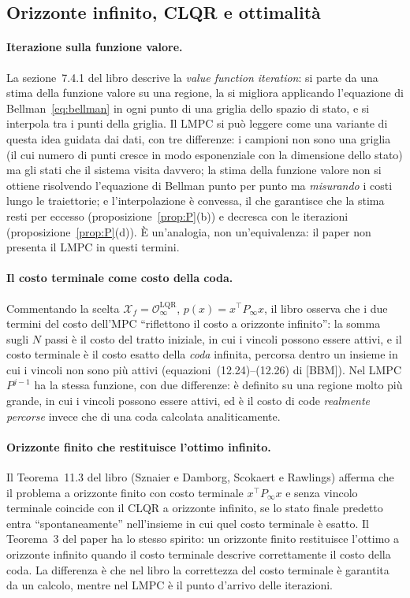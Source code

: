 \documentclass[11pt,a4paper]{article}
\theoremstyle{definition}
\theoremstyle{plain}
\theoremstyle{remark}
\newcommand{\Xf}{\mathcal{X}_f}
\begin{document}
\subsection{Orizzonte infinito, CLQR e ottimalità}\label{sec:libro-clqr}

\paragraph{Iterazione sulla funzione valore.}
La sezione~7.4.1 del libro descrive la \emph{value function iteration}: si
parte da una stima della funzione valore su una regione, la si migliora
applicando l'equazione di Bellman~\eqref{eq:bellman} in ogni punto di una
griglia dello spazio di stato, e si interpola tra i punti della griglia. Il
LMPC si può leggere come una variante di questa idea guidata dai dati, con
tre differenze: i campioni non sono una griglia (il cui numero di punti cresce
in modo esponenziale con la dimensione dello stato) ma gli stati che il
sistema visita davvero; la stima della funzione valore non si ottiene
risolvendo l'equazione di Bellman punto per punto ma \emph{misurando} i costi
lungo le traiettorie; e l'interpolazione è convessa, il che garantisce che la
stima resti per eccesso (proposizione~\ref{prop:P}(b)) e decresca con le
iterazioni (proposizione~\ref{prop:P}(d)). È un'analogia, non
un'equivalenza: il paper non presenta il LMPC in questi termini.

\paragraph{Il costo terminale come costo della coda.}
Commentando la scelta $\Xf=\mathcal{O}^{\mathrm{LQR}}_\infty$,
$p(x)=x^\top P_\infty x$, il libro osserva che i due termini del costo
dell'MPC ``riflettono il costo a orizzonte infinito'': la somma sugli $N$
passi è il costo del tratto iniziale, in cui i vincoli possono essere attivi,
e il costo terminale è il costo esatto della \emph{coda} infinita, percorsa
dentro un insieme in cui i vincoli non sono più attivi
(equazioni~(12.24)--(12.26) di [BBM]). Nel LMPC $P^{j-1}$ ha la stessa
funzione, con due differenze: è definito su una regione molto più grande, in
cui i vincoli possono essere attivi, ed è il costo di code \emph{realmente
percorse} invece che di una coda calcolata analiticamente.

\paragraph{Orizzonte finito che restituisce l'ottimo infinito.}
Il Teorema~11.3 del libro (Sznaier e Damborg, Scokaert e Rawlings) afferma che
il problema a orizzonte finito con costo terminale $x^\top P_\infty x$ e senza
vincolo terminale coincide con il CLQR a orizzonte infinito, se lo stato
finale predetto entra ``spontaneamente'' nell'insieme in cui quel costo
terminale è esatto. Il Teorema~3 del paper ha lo stesso spirito: un orizzonte
finito restituisce l'ottimo a orizzonte infinito quando il costo terminale
descrive correttamente il costo della coda. La differenza è che nel libro la
correttezza del costo terminale è garantita da un calcolo, mentre nel LMPC è
il punto d'arrivo delle iterazioni.
\end{document}
